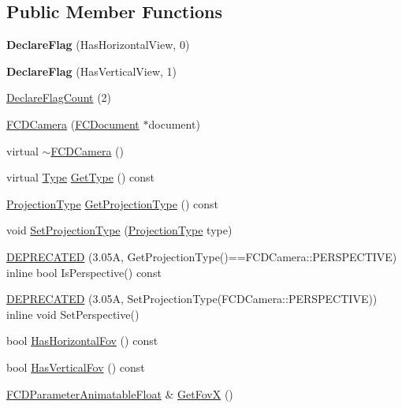 \subsection*{Public Member Functions}
\begin{DoxyCompactItemize}
\item 
\hypertarget{classFCDCamera_ab05984fe8d1ed66c27d0427ae3160ced}{
{\bfseries DeclareFlag} (HasHorizontalView, 0)}
\label{classFCDCamera_ab05984fe8d1ed66c27d0427ae3160ced}

\item 
\hypertarget{classFCDCamera_ac21eb4daaaa96b53793ff7d9bfbae48f}{
{\bfseries DeclareFlag} (HasVerticalView, 1)}
\label{classFCDCamera_ac21eb4daaaa96b53793ff7d9bfbae48f}

\item 
\hyperlink{classFCDCamera_a4d7c2057f783fbb34201c94899b124f7}{DeclareFlagCount} (2)
\item 
\hyperlink{classFCDCamera_accd96cd61f1479822036b39892669160}{FCDCamera} (\hyperlink{classFCDocument}{FCDocument} $\ast$document)
\item 
virtual \hyperlink{classFCDCamera_adb60b65448c97173f6ef01a625f63871}{$\sim$FCDCamera} ()
\item 
virtual \hyperlink{classFCDEntity_a9301a4bd5f4d4190ec13e40db4effdd7}{Type} \hyperlink{classFCDCamera_aa07c99de0148e39b46e33733852ef229}{GetType} () const 
\item 
\hyperlink{classFCDCamera_a6afb103bc3857a0e059dc0174a48616d}{ProjectionType} \hyperlink{classFCDCamera_a87c02ee9c85798fde4d7db01da5880f4}{GetProjectionType} () const 
\item 
void \hyperlink{classFCDCamera_a92d5b5ee50e2b59e5661498d97d8fc65}{SetProjectionType} (\hyperlink{classFCDCamera_a6afb103bc3857a0e059dc0174a48616d}{ProjectionType} type)
\item 
\hyperlink{classFCDCamera_a4b1071013b2640f05dbdf14320f75f3a}{DEPRECATED} (3.05A, GetProjectionType()==FCDCamera::PERSPECTIVE) inline bool IsPerspective() const 
\item 
\hyperlink{classFCDCamera_ab0ff15b9a68bd2e02cc5fe6281c65b28}{DEPRECATED} (3.05A, SetProjectionType(FCDCamera::PERSPECTIVE)) inline void SetPerspective()
\item 
bool \hyperlink{classFCDCamera_af5b0f3acc94e585b3d6b7a97d2b33600}{HasHorizontalFov} () const 
\item 
bool \hyperlink{classFCDCamera_ae08e063c02ac91d0fb834aaba29fec74}{HasVerticalFov} () const 
\item 
\hyperlink{classFCDParameterAnimatableT}{FCDParameterAnimatableFloat} \& \hyperlink{classFCDCamera_a48a470386f1f7985ee4524a713f92db9}{GetFovX} ()

\end{DoxyCompactItemize}
